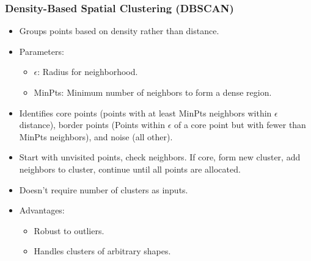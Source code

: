 \documentclass[12pt,a4paper]{article}
\begin{document}
\subsubsection{Density-Based Spatial Clustering (DBSCAN)}
\begin{itemize}
    \item Groups points based on density rather than distance.
    \item Parameters:
    \begin{itemize}
        \item $\epsilon$: Radius for neighborhood.
        \item MinPts: Minimum number of neighbors to form a dense region.
    \end{itemize}
    \item Identifies core points (points with at least MinPts neighbors within $\epsilon$ distance), border points (Points within $\epsilon$ of a core point but with fewer than MinPts neighbors), and noise (all other).
    \item Start with unvisited points, check neighbors. If core, form new cluster, add neighbors to cluster, continue until all points are allocated.
    \item Doesn't require number of clusters as inputs.
    \item Advantages:
    \begin{itemize}
        \item Robust to outliers.
        \item Handles clusters of arbitrary shapes.
    \end{itemize}
\end{itemize}
\end{document}
